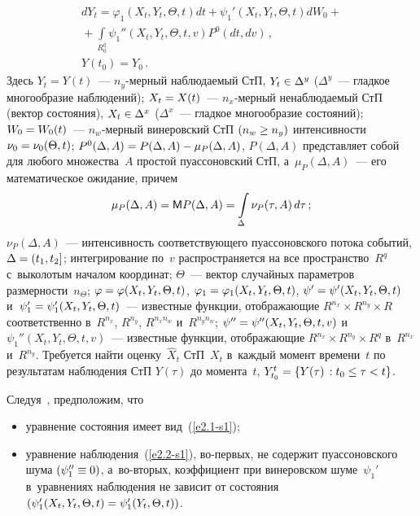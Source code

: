 \begin{multicols}{2}
    \noindent
    \begin{multline}
dY_t =\varphi_1 \left(X_t,Y_t,\Theta, t\right) dt +
    \psi_1' \left(X_t,Y_t,\Theta, t\right) dW_0 + {}\\
{}+\int\limits_{R_0^q} \psi_1'' \left(X_t,Y_t,\Theta, t,v\right) P^0
    (dt,dv)\,,\\
     Y\left(t_0\right) = Y_0\,.
    \label{e2.2-s1}
    \end{multline}
Здесь $Y_t=Y(t)$~--- $n_y$-мер\-ный наблюдаемый
СтП, $Y_t \hm\in \Delta^y$ ($\Delta^y$~--- гладкое многообразие наблюдений); 
$X_t \hm=X(t)$~--- $n_x$-мер\-ный ненаблюдаемый
СтП (вектор состояния), $X_t \hm\in \Delta^x$ ($\Delta^x$~--- 
гладкое многообразие состояний); $W_0\hm =W_0(t)$~--- $n_w$-мер\-ный
винеровский СтП $(n_w\hm\ge n_y)$ интенсивности  $\nu_0 \hm=\nu_0 (\Theta, t)$; 
$P^0(\Delta,A)\hm=P(\Delta,A)-\mu_P (\Delta,A)$, $P(\Delta,A)$  представляет 
собой для любого множества~$A$ прос\-той пуассоновский СтП, а~$\mu_P (\Delta,A)$~--- 
его математическое ожидание, причем
    $$
    \mu_P (\Delta,A)={\sf M} P (\Delta,A)=\int\limits_\Delta \nu_P(\tau, A)\, d\tau\,;
    $$
$\nu_P (\Delta, A)$~--- интенсивность соответствующего пуассоновского
потока событий, $\Delta \hm=(t_1,t_2]$; интегрирование по~$v$
распространяется на все пространство~$R^q$ с~выколотым началом
координат; $\Theta$~--- вектор случайных параметров размерности~$n_\Theta$; 
$\varphi\hm=\varphi(X_t,Y_t,\Theta, t)$,
$\varphi_1\hm=\varphi_1(X_t,Y_t,\Theta, t)$,
 $\psi'\hm=\psi'(X_t,Y_t,\Theta, t)$ и~$\psi_1'\hm=\psi_1'(X_t,Y_t,\Theta, t)$~--- 
 известные функции, отображающие
$R^{n_x}\times R^{n_y}\times  R$ соответственно в~$R^{n_x}$,
$R^{n_y}$, $R^{n_xn_w}$ и~$R^{n_yn_w}$; $\psi''\hm=\psi''(X_t,Y_t,\Theta, t,v)$ 
и~$\psi_1''(X_t,Y_t,\Theta, t,v)$~--- известные
функции, отображающие $R^{n_x}\times R^{n_y}\times R^q$ в~$R^{n_x}$ и~$R^{n_y}$. 
Требуется найти оценку~$\hat X_t$ СтП~$X_t$ 
в~каждый момент времени~$t$ по результатам наблюдения
СтП $Y(\tau)$ до момента~$t$, $Y_{t_0}^t \hm=  \{ Y(\tau) \,: t_0 \hm\le \tau\hm< t\}$.

Следуя~\cite{8-s1}, предположим, что
\begin{itemize}
\item уравнение состояния имеет вид~(\ref{e2.1-s1});

\item уравнение наблюдения~(\ref{e2.2-s1}), во-пер\-вых, не содержит
пуассоновского шума $(\psi_1'' \hm\equiv 0)$, 
а~во-вто\-рых, коэффициент при винеровском шуме~$\psi_1'$  
в~уравнениях наблюдения не зависит от состояния $(\psi_1' (X_t, Y_t,\Theta, t)\hm=\psi_1'
(Y_t,\Theta, t))$.
\end{itemize}


\end{multicols}
